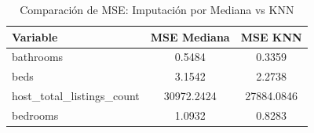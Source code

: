 \begin{table}[H]
\centering
\caption{Comparación de MSE: Imputación por Mediana vs KNN}
\label{tab:knnVsMedian}
\begin{tabular}{lcc}
\toprule
Variable & MSE Mediana & MSE KNN \\
\midrule
bathrooms & 0.5484 & 0.3359 \\
beds & 3.1542 & 2.2738 \\
host\_total\_listings\_count & 30972.2424 & 27884.0846 \\
bedrooms & 1.0932 & 0.8283 \\
\bottomrule
\end{tabular}
\end{table}